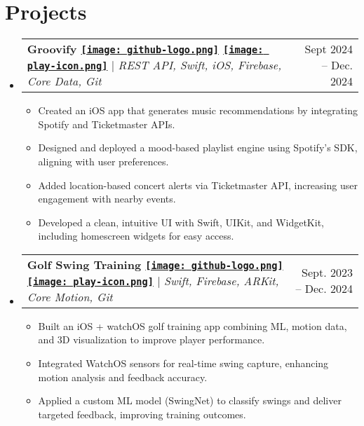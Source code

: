 \documentclass[letterpaper,11pt]{article}
\makeatletter
\newcommand{\resumeItem}[1]{
  \item\small{
    {#1 \vspace{-2pt}}
  }
}
\newcommand{\resumeProjectHeading}[2]{
    \item
    \begin{tabular*}{0.97\textwidth}{l@{\extracolsep{\fill}}r}
      \small#1 & #2 \\
    \end{tabular*}\vspace{-7pt}
}
\newcommand{\resumeSubHeadingListStart}{\begin{itemize}[leftmargin=0.15in, label={}]}
\newcommand{\resumeSubHeadingListEnd}{\end{itemize}}
\newcommand{\resumeItemListStart}{\begin{itemize}}
\newcommand{\resumeItemListEnd}{\end{itemize}\vspace{-5pt}}
\makeatother
\begin{document}
\section{Projects}
    \resumeSubHeadingListStart
      \resumeProjectHeading
          {\textbf{{Groovify}
          \href{https://github.com/Adolfo-David-Romero/Groovify}{\texttt{[image: github-logo.png]}}
          \href{https://www.youtube.com/watch?v=jSiBa_nlCQs}{\texttt{[image: play-icon.png]}}} 
          $|$ \emph{REST API, Swift, iOS, Firebase, Core Data, Git}}{Sept 2024 -- Dec. 2024}
          \resumeItemListStart
            \resumeItem{Created an iOS app that generates music recommendations by integrating Spotify and Ticketmaster APIs.}
            \resumeItem{Designed and deployed a mood-based playlist engine using Spotify’s SDK, aligning with user preferences.}
            \resumeItem{Added location-based concert alerts via Ticketmaster API, increasing user engagement with nearby events.}
            \resumeItem{Developed a clean, intuitive UI with Swift, UIKit, and WidgetKit, including homescreen widgets for easy access.}
          \resumeItemListEnd
          \resumeProjectHeading
          {\textbf{{Golf Swing Training}
          \href{https://github.com/HarryLiu4154/GolfSwingTrainer.git}{\texttt{[image: github-logo.png]}}
          \href{https://www.youtube.com/watch?v=8hmRoTPjfsE}{\texttt{[image: play-icon.png]}}} 
          $|$ \emph{Swift, Firebase, ARKit, Core Motion, Git}}{Sept. 2023 -- Dec. 2024}
          \resumeItemListStart
            \resumeItem{Built an iOS + watchOS golf training app combining ML, motion data, and 3D visualization to improve player performance.}
            \resumeItem{Integrated WatchOS sensors for real-time swing capture, enhancing motion analysis and feedback accuracy.}
            \resumeItem{Applied a custom ML model (SwingNet) to classify swings and deliver targeted feedback, improving training outcomes.}
          \resumeItemListEnd
    \resumeSubHeadingListEnd


\end{document}
